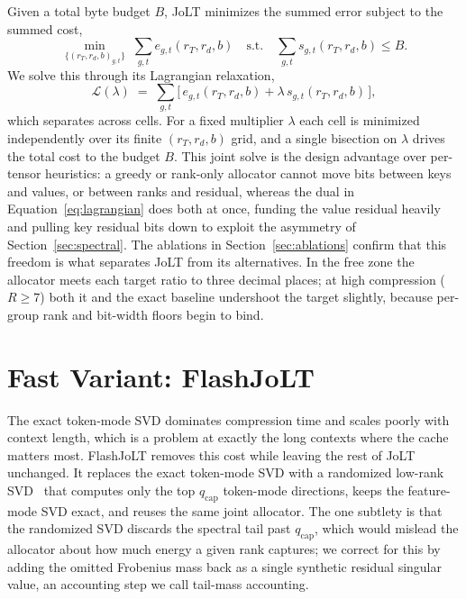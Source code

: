 \documentclass{article}
\begin{document}
Given a total byte budget $B$, JoLT minimizes the summed error subject to the summed cost,
\begin{equation}
  \min_{\{(r_T, r_d, b)_{g,t}\}} \; \sum_{g,t} e_{g,t}(r_T, r_d, b)
  \quad \text{s.t.} \quad \sum_{g,t} s_{g,t}(r_T, r_d, b) \le B .
  \label{eq:problem}
\end{equation}
We solve this through its Lagrangian relaxation,
\begin{equation}
  \mathcal{L}(\lambda) \;=\; \sum_{g,t} \Big[\, e_{g,t}(r_T, r_d, b) + \lambda\, s_{g,t}(r_T, r_d, b) \,\Big],
  \label{eq:lagrangian}
\end{equation}
which separates across cells. For a fixed multiplier $\lambda$ each cell is minimized independently over its finite $(r_T, r_d, b)$ grid, and a single bisection on $\lambda$ drives the total cost to the budget $B$. This joint solve is the design advantage over per-tensor heuristics: a greedy or rank-only allocator cannot move bits between keys and values, or between ranks and residual, whereas the dual in Equation~\eqref{eq:lagrangian} does both at once, funding the value residual heavily and pulling key residual bits down to exploit the asymmetry of Section~\ref{sec:spectral}. The ablations in Section~\ref{sec:ablations} confirm that this freedom is what separates JoLT from its alternatives. In the free zone the allocator meets each target ratio to three decimal places; at high compression ($R \ge 7$) both it and the exact baseline undershoot the target slightly, because per-group rank and bit-width floors begin to bind.

\section{Fast Variant: FlashJoLT}
\label{sec:fast}
The exact token-mode SVD dominates compression time and scales poorly with context length, which is a problem at exactly the long contexts where the cache matters most. FlashJoLT removes this cost while leaving the rest of JoLT unchanged. It replaces the exact token-mode SVD with a randomized low-rank SVD~\citep{halko2011randomized} that computes only the top $q_{\mathrm{cap}}$ token-mode directions, keeps the feature-mode SVD exact, and reuses the same joint allocator. The one subtlety is that the randomized SVD discards the spectral tail past $q_{\mathrm{cap}}$, which would mislead the allocator about how much energy a given rank captures; we correct for this by adding the omitted Frobenius mass back as a single synthetic residual singular value, an accounting step we call tail-mass accounting.
\end{document}
